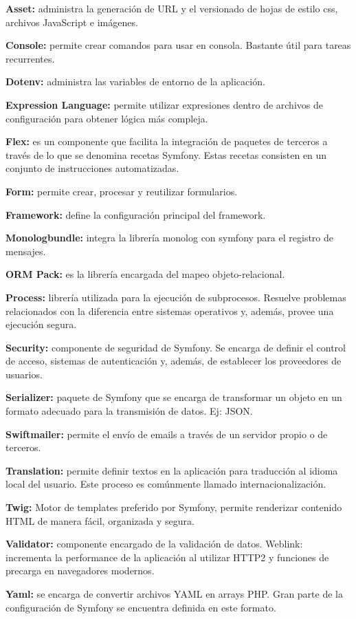 \item \textbf{Asset:} administra la generación de URL y el versionado de hojas de estilo css, archivos JavaScript e imágenes.
\item \textbf{Console:} permite crear comandos para usar en consola. Bastante útil para tareas recurrentes.
\item \textbf{Dotenv:} administra las variables de entorno de la aplicación.
\item \textbf{Expression Language:} permite utilizar expresiones dentro de archivos de configuración para obtener lógica más compleja.
\item \label{itm:flex} \textbf{Flex:} es un componente que facilita la integración de paquetes de terceros a través de lo que se denomina recetas Symfony. Estas recetas consisten en un conjunto de instrucciones automatizadas.
\item \textbf{Form:} permite crear, procesar y reutilizar formularios.
\item \textbf{Framework:} define la configuración principal del framework.
\item \textbf{Monologbundle:} integra la librería monolog con symfony para el registro de mensajes.
\item \textbf{ORM Pack:} es la librería encargada del mapeo objeto-relacional.
\item \textbf{Process:} librería utilizada para la ejecución de subprocesos. Resuelve problemas relacionados con la diferencia entre sistemas operativos
y, además, provee una ejecución segura.
\item \textbf{Security:} componente de seguridad de Symfony. Se encarga de definir el control de acceso, sistemas de autenticación y, además, de establecer
los proveedores de usuarios.
\item \textbf{Serializer:} paquete de Symfony que se encarga de transformar un objeto en un formato adecuado para la transmisión de datos. Ej: JSON.
\item \textbf{Swiftmailer:} permite el envío de emails a través de un servidor propio o de terceros.
\item \textbf{Translation:} permite definir textos en la aplicación para traducción al idioma local del usuario. Este proceso es comúnmente llamado internacionalización.
\item \textbf{Twig:} Motor de templates preferido por Symfony, permite renderizar contenido HTML de manera fácil, organizada y segura.
\item \textbf{Validator:} componente encargado de la validación de datos. Weblink: incrementa la performance de la aplicación al utilizar HTTP2 y funciones de precarga en navegadores modernos.
\item \textbf{Yaml:} se encarga de convertir archivos YAML en arrays PHP. Gran parte de la configuración de Symfony se encuentra definida en este formato.
